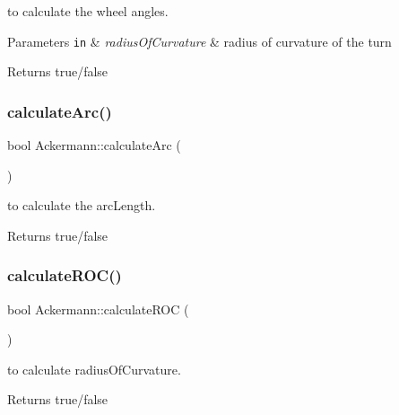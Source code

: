 to calculate the wheel angles. 


\begin{DoxyParams}[1]{Parameters}
\mbox{\tt in}  & {\em radius\+Of\+Curvature} & radius of curvature of the turn \\
\hline
\end{DoxyParams}
\begin{DoxyReturn}{Returns}
true/false 
\end{DoxyReturn}
\mbox{\label{classAckermann_aeda04f68ce78522c4582246e0c14c625}} 
\subsubsection{\texorpdfstring{calculate\+Arc()}{calculateArc()}}
{\footnotesize\ttfamily bool Ackermann\+::calculate\+Arc (\begin{DoxyParamCaption}{ }\end{DoxyParamCaption})}



to calculate the arc\+Length. 

\begin{DoxyReturn}{Returns}
true/false 
\end{DoxyReturn}
\mbox{\label{classAckermann_aef4ea40841c9a1bb8ad0847f5fe29d93}} 
\subsubsection{\texorpdfstring{calculate\+R\+O\+C()}{calculateROC()}}
{\footnotesize\ttfamily bool Ackermann\+::calculate\+R\+OC (\begin{DoxyParamCaption}{ }\end{DoxyParamCaption})}



to calculate radius\+Of\+Curvature. 

\begin{DoxyReturn}{Returns}
true/false 
\end{DoxyReturn}
\mbox{\label{classAckermann_a61fd011325719efd9e60f1dbab919d29}} 

